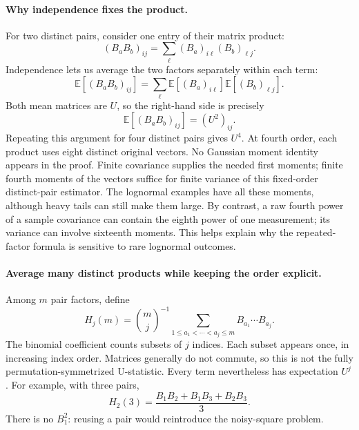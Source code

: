 \documentclass[11pt]{article}
\newcommand{\E}{\mathbb{E}}
\begin{document}
\paragraph{Why independence fixes the product.}
For two distinct pairs, consider one entry of their matrix product:
\begin{equation}
 (B_aB_b)_{ij}=\sum_\ell (B_a)_{i\ell}(B_b)_{\ell j}.
\end{equation}
Independence lets us average the two factors separately within each term:
\begin{equation}
 \E[(B_aB_b)_{ij}]
 =\sum_\ell \E[(B_a)_{i\ell}]\E[(B_b)_{\ell j}].
\end{equation}
Both mean matrices are $U$, so the right-hand side is precisely
\begin{equation}
 \E[(B_aB_b)_{ij}]=(U^2)_{ij}.
\end{equation}
Repeating this argument for four distinct pairs gives $U^4$. At fourth
order, each product uses eight distinct original vectors. No Gaussian
moment identity appears in the proof. Finite covariance supplies the needed
first moments; finite fourth moments of the vectors suffice for finite
variance of this fixed-order distinct-pair estimator. The lognormal examples
have all these moments, although heavy tails can still make them large. By contrast, a raw
fourth power of a sample covariance can contain the eighth power of one
measurement; its variance can involve sixteenth moments. This helps explain
why the repeated-factor formula is sensitive to rare lognormal outcomes.

\paragraph{Average many distinct products while keeping the order explicit.}
Among $m$ pair factors, define
\begin{equation}
 H_j(m)=\binom mj^{-1}
 \sum_{1\leq a_1<\cdots<a_j\leq m} B_{a_1}\cdots B_{a_j}.
\end{equation}
The binomial coefficient counts subsets of $j$ indices. Each subset appears
once, in increasing index order. Matrices generally do not commute, so this
is not the fully permutation-symmetrized U-statistic. Every term nevertheless
has expectation $U^j$. For example, with three pairs,
\begin{equation}
 H_2(3)=\frac{B_1B_2+B_1B_3+B_2B_3}{3}.
\end{equation}
There is no $B_1^2$: reusing a pair would reintroduce the noisy-square problem.
\end{document}
